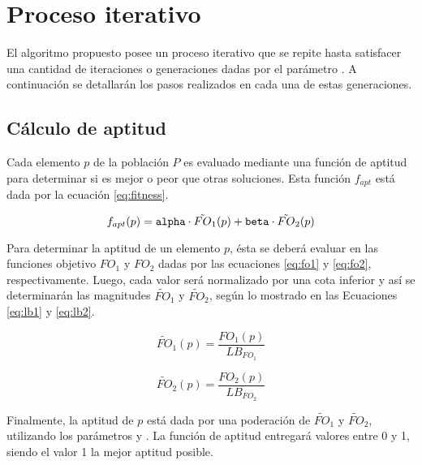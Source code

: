 \section{Proceso iterativo}

El algoritmo propuesto posee un proceso iterativo que se repite hasta satisfacer una cantidad de iteraciones o generaciones dadas por el parámetro \generaciones. A continuación se detallarán los pasos realizados en cada una de estas generaciones.

\subsection{Cálculo de aptitud}

Cada elemento $p$ de la población $P$ es evaluado mediante una función de aptitud para determinar si es mejor o peor que otras soluciones. Esta función $f_{apt}$ está dada por la ecuación \eqref{eq:fitness}.

\begin{equation}
\label{eq:fitness}
f_{apt}(p) = \texttt{alpha} \cdot \tilde{FO}_1(p) + \texttt{beta} \cdot \tilde{FO}_2(p)
\end{equation}

Para determinar la aptitud de un elemento $p$, ésta se deberá evaluar en las funciones objetivo $FO_1$ y $FO_2$ dadas por las ecuaciones \eqref{eq:fo1} y \eqref{eq:fo2}, respectivamente. Luego, cada valor será normalizado por una cota inferior y así se determinarán las magnitudes $\tilde{FO}_1$ y $\tilde{FO}_2$, según lo mostrado en las Ecuaciones \eqref{eq:lb1} y \eqref{eq:lb2}.

\begin{equation}
\label{eq:lb1}
\tilde{FO}_1(p) = \frac{FO_1(p)}{LB_{FO_1}}
\end{equation}

\begin{equation}
\label{eq:lb2}
\tilde{FO}_2(p) = \frac{FO_2(p)}{LB_{FO_2}}
\end{equation}

Finalmente, la aptitud de $p$ está dada por una poderación de $\tilde{FO}_1$ y $\tilde{FO}_2$, utilizando los parámetros \alp{} y \bet. La función de aptitud entregará valores entre 0 y 1, siendo el valor 1 la mejor aptitud posible.


